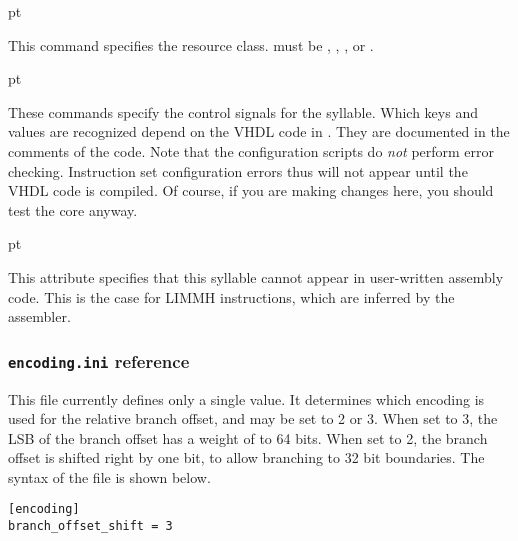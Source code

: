  pt

\noindent This command specifies the resource class.  must be 
, , ,  or .

 pt





\noindent These commands specify the control signals for the syllable. Which
keys and values are recognized depend on the VHDL code in
. They are documented in the comments of the code.
Note that the configuration scripts do \emph{not} perform error checking.
Instruction set configuration errors thus will not appear until the VHDL code is
compiled. Of course, if you are making changes here, you should test the core
anyway.

 pt
\codehead{\noasm{}}

\noindent This attribute specifies that this syllable cannot appear in 
user-written assembly code. This is the case for LIMMH instructions, which are 
inferred by the assembler.


\subsubsection[encoding.ini reference]{\texttt{encoding.ini} reference}
\label{sec:core-ug-cfg-opc-ini}

This file currently defines only a single value. It determines which encoding is 
used for the relative branch offset, and may be set to 2 or 3. When set to 3, 
the LSB of the branch offset has a weight of to 64 bits. When set to 2, the 
branch offset is shifted right by one bit, to allow branching to 32 bit 
boundaries. The syntax of the file is shown below.

\begin{lstlisting}[numbers=none, language=nothing]
[encoding]
branch_offset_shift = 3
\end{lstlisting}



